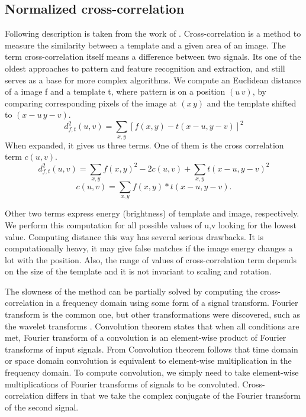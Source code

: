 \begin{description}
\section{Normalized cross-correlation}
Following description is taken from the work of \cite{crossCorrLewis}.
Cross-correlation is a method to measure the similarity between a template and a given area of an image. The term cross-correlation itself means a difference between two signals. Its one of the oldest approaches to pattern and feature recognition and extraction, and still serves as a base for more complex algorithms.
We compute an Euclidean distance of a image f and a template t, where pattern is on a position $(u\,v)$, by comparing corresponding pixels of the image at $(x\,y)$ and the template shifted to $(x-u\,y-v)$. 
\begin{equation*}
d_{f,t}^{2}(u,v)=\sum_{x,y} [ f(x,y) - t(x-u, y-v) ]^{2} 
\end{equation*}
When expanded, it gives us three terms. One of them is the cross correlation term $c(u,v)$.
\begin{equation*}
d_{f,t}^{2}(u,v)=\sum_{x,y} f(x,y)^{2} - 2c(u,v) + \sum_{x,y} t(x-u, y-v)^2
\end{equation*}
\begin{equation*}
c(u,v)=\sum_{x,y} f(x,y) * t(x-u, y-v).
\end{equation*}

Other two terms express energy (brightness) of template and image, respectively. We perform this computation for all possible values of u,v looking for the lowest value. Computing distance this way has several serious drawbacks. It is computationally heavy, it may give false matches if the image energy changes a lot with the position. Also, the range of values of cross-correlation term depends on the size of the template and it is not invariant to scaling and rotation. 

The slowness of the method can be partially solved by computing the cross-correlation in a frequency domain using some form of a signal transform. Fourier transform is the common one, but other transformations were discovered, such as the wavelet transforms \cite{patternRecNN}. Convolution theorem states that when all conditions are met, Fourier transform of a convolution is an element-wise product of Fourier transforms of input signals. From Convolution theorem follows that time domain or space domain convolution is equivalent to element-wise multiplication in the frequency domain. To compute convolution, we simply need to take element-wise multiplications of Fourier transforms of signals to be convoluted. Cross-correlation differs in that we take the complex conjugate of the Fourier transform of the second signal.


\end{description}
